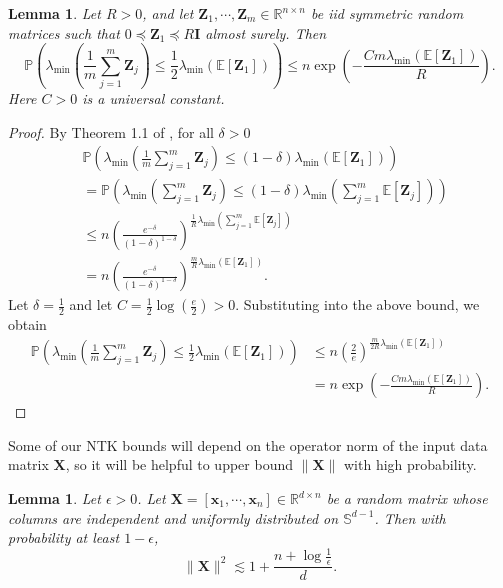 \documentclass{article}
\newtheorem{lemma}[theorem]{Lemma}
\theoremstyle{definition}
\newcommand*{\R}{\mathbb{R}}
\renewcommand{\P}{\mathbb{P}}
\newcommand{\E}{\mathbb{E}}
\renewcommand{\S}{\mathbb{S}}
\def\vx{{\bm{x}}}
\def\mI{{\bm{I}}}
\def\mX{{\bm{X}}}
\def\mZ{{\bm{Z}}}
\begin{document}
\begin{lemma}\label{lem:matrix-chernoff}
    Let $R > 0$, and let $\mZ_1, \cdots, \mZ_m \in \R^{n \times n}$ be iid symmetric random matrices such that $0 \preceq \mZ_1 \preceq R\mI$ almost surely. 
    Then
    \[\P\left(\lambda_{\min}\left(\frac{1}{m}\sum_{j = 1}^m \mZ_j \right) \leq \frac{1}{2}\lambda_{\min}\left(\E[\mZ_1] \right) \right) \leq n \exp\left(-\frac{Cm\lambda_{\min}(\E[\mZ_1]) }{R} \right). \]
    Here $C > 0$ is a universal constant.
\end{lemma}
\begin{proof}
    By Theorem 1.1 of \cite{tropp2012user}, for all $\delta > 0$
    \begin{align*}
        &\P\left(\lambda_{\min}\left(\frac{1}{m} \sum_{j = 1}^m \mZ_j\right) \leq (1 - \delta)\lambda_{\min}(\E[\mZ_1])  \right)  \\&=\P\left(\lambda_{\min}\left( \sum_{j = 1}^m \mZ_j \right) \leq (1 - \delta)\lambda_{\min}\left(\sum_{j = 1}^m \E[\mZ_j] \right) \right)\\
        &\leq n \left(\frac{e^{-\delta} }{(1 - \delta)^{1 - \delta}} \right)^{\frac{1}{R}\lambda_{\min}\left(\sum_{j = 1}^m \E[\mZ_j]\right) }\\
        &= n \left(\frac{e^{-\delta} }{(1 - \delta)^{1 - \delta}} \right)^{\frac{m}{R}\lambda_{\min}\left(\E[\mZ_1]\right) }.
    \end{align*}
    Let $\delta = \frac{1}{2}$ and let $C = \frac{1}{2}\log\left(\frac{e}{2}\right) > 0$. Substituting into the above bound, we obtain
    \begin{align*}
        \P\left(\lambda_{\min}\left(\frac{1}{m}\sum_{j = 1}^m \mZ_j \right) \leq \frac{1}{2} \lambda_{\min}(\E[\mZ_1])\right) &\leq n \left(\frac{2}{e} \right)^{\frac{m}{2R}\lambda_{\min}(\E[\mZ_1]) }\\
        &= n \exp\left(-\frac{C m \lambda_{\min}(\E[\mZ_1]) }{R} \right).
    \end{align*}
\end{proof}
Some of our NTK bounds will depend on the operator norm of the input data matrix $\mX$, so it will be helpful to upper bound $\|\mX\|$ with high probability.
\begin{lemma}\label{lemma:input-data-conditioning}
    Let $\epsilon > 0$. Let $\mX = [\vx_1, \cdots, \vx_n] \in \R^{d \times n}$ be a random matrix whose columns are independent and uniformly distributed on $\S^{d - 1}$. Then with probability at least $1 - \epsilon$,
    \[\|\mX\|^2 \lesssim 1 + \frac{n + \log \frac{1}{\epsilon} }{d}. \]
\end{lemma}
\end{document}

